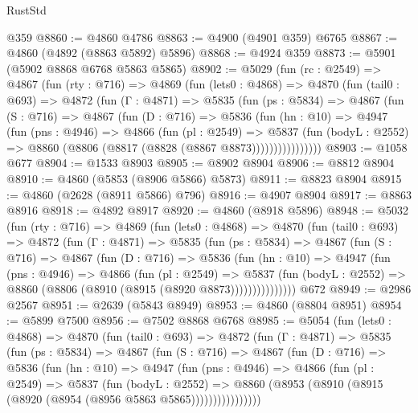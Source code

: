 \begin{lexlean}{RustStd}
\begin{coremodule}
    @359
@8860 := @4860 @4786
@8863 := @4900 (@4901 @359) @6765
@8867 := @4860 (@4892 (@8863 @5892) @5896)
@8868 := @4924 @359
@8873 := @5901 (@5902 @8868 @6768 @5863 @5865)
@8902 := @5029
    (fun (rc : @2549) =>
    @4867
      (fun (rty : @716) =>
      @4869
        (fun (lets0 : @4868) =>
        @4870
          (fun (tail0 : @693) =>
          @4872
            (fun (Γ : @4871) =>
            @5835
              (fun (ps : @5834) =>
              @4867
                (fun (S : @716) =>
                @4867
                  (fun (D : @716) =>
                  @5836
                    (fun (hn : @10) =>
                    @4947
                      (fun (pns : @4946) =>
                      @4866
                        (fun (pl : @2549) =>
                        @5837
                          (fun (bodyL : @2552) =>
                          @8860 (@8806 (@8817 (@8828 (@8867 @8873))))))))))))))))
@8903 := @1058 @677
@8904 := @1533 @8903
@8905 := @8902 @8904
@8906 := @8812 @8904
@8910 := @4860 (@5853 (@8906 @5866) @5873)
@8911 := @8823 @8904
@8915 := @4860 (@2628 (@8911 @5866) @796)
@8916 := @4907 @8904
@8917 := @8863 @8916
@8918 := @4892 @8917
@8920 := @4860 (@8918 @5896)
@8948 := @5032
    (fun (rty : @716) =>
    @4869
      (fun (lets0 : @4868) =>
      @4870
        (fun (tail0 : @693) =>
        @4872
          (fun (Γ : @4871) =>
          @5835
            (fun (ps : @5834) =>
            @4867
              (fun (S : @716) =>
              @4867
                (fun (D : @716) =>
                @5836
                  (fun (hn : @10) =>
                  @4947
                    (fun (pns : @4946) =>
                    @4866
                      (fun (pl : @2549) =>
                      @5837
                        (fun (bodyL : @2552) =>
                        @8860 (@8806 (@8910 (@8915 (@8920 @8873)))))))))))))))
    @672
@8949 := @2986 @2567
@8951 := @2639 (@5843 @8949)
@8953 := @4860 (@8804 @8951)
@8954 := @5899 @7500
@8956 := @7502 @8868 @6768
@8985 := @5054
    (fun (lets0 : @4868) =>
    @4870
      (fun (tail0 : @693) =>
      @4872
        (fun (Γ : @4871) =>
        @5835
          (fun (ps : @5834) =>
          @4867
            (fun (S : @716) =>
            @4867
              (fun (D : @716) =>
              @5836
                (fun (hn : @10) =>
                @4947
                  (fun (pns : @4946) =>
                  @4866
                    (fun (pl : @2549) =>
                    @5837
                      (fun (bodyL : @2552) =>
                      @8860 (@8953 (@8910 (@8915 (@8920 (@8954 (@8956 @5863 @5865))))))))))))))))

\end{coremodule}
\end{lexlean}
